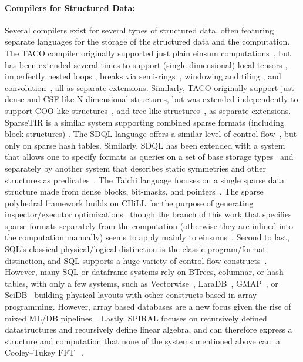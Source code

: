 \paragraph{ Compilers for Structured Data:}
Several compilers exist for several types of structured data, often featuring separate languages for the storage of the structured data and the computation.
%
The TACO compiler originally supported just plain einsum computations~\cite{kjolstad_tensor_2017}, but has been extended several times to support (single dimensional) local tensors \cite{kjolstad_tensor_2019}, imperfectly nested loops \cite{dias_sparselnr_2022}, breaks via semi-rings~\cite{henry_compilation_2021}, windowing and tiling \cite{senanayake2020sparse}, and convolution~\cite{won2023unified}, all as separate extensions.
%
Similarly, TACO originally support just dense and CSF like N dimensional structures, but was extended independently to support COO like structures~\cite{chou2018format}, and tree like structures~\cite{chou2022compilation}, as separate extensions. SparseTIR is a similar system supporting combined 
sparse formats (including block structures) \cite{ye_sparsetir_2022}.
%
The SDQL language offers a similar level of control flow~\cite{shaikhha2022functional}, but only on sparse hash tables.
%
Similarly, SDQL has been extended with a system that allows one to specify formats as queries on a set of base storage types~\cite{schleich2023optimizing} and separately by another system that describes static symmetries and other structures as predicates~\cite{ghorbani2023compiling}.
%
The Taichi language focuses on a single sparse data structure made from dense blocks, bit-masks, and pointers~\cite{hu_taichi_2019}.
%
%
The sparse polyhedral framework builds on CHiLL for the purpose of generating inspector/executor optimizations~\cite{strout2018sparse} though the branch of this work that specifies sparse formats separately from the computation (otherwise they are inlined into the computation manually) seems to apply mainly to einsums~\cite{zhao2022polyhedral}.
%
Second to last, SQL's classical physical/logical distinction is the classic program/format distinction, and SQL supports a huge variety of control flow constructs~\cite{kotlyar1997relational, date1989guide}.
%
However, many SQL or dataframe systems rely on BTrees, columnar, or hash tables, with only a few systems, such as Vectorwise~\cite{boncz2012vectorwise}, LaraDB~\cite{hutchison2017laradb}, GMAP~\cite{tsatalos1996gmap}, or SciDB~\cite{stonebraker2013scidb} building physical layouts with other constructs based in array programming.
%
However, array based databases are a new focus given the rise of mixed ML/DB pipelines~\cite{baumann2021array,luo2018scalable}.
%
Lastly, SPIRAL focuses on recursively defined datastructures and recursively define linear algebra, and can therefore express a structure and computation that none of the systems mentioned above can: a Cooley–Tukey FFT ~\cite{franchetti2018spiral,franchetti2009operator}.
%

